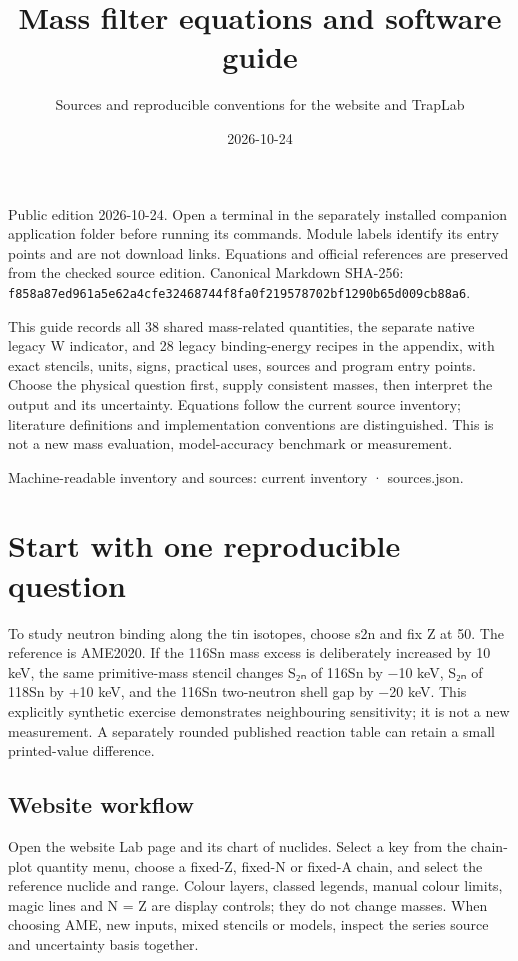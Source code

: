 \documentclass[
  11pt,
  letterpaper,
]{article}
\title{Mass filter equations and software guide}
\subtitle{Sources and reproducible conventions for the website and
TrapLab}
\author{}
\date{2026-10-24}
\begin{document}
\maketitle

Public edition 2026-10-24. Open a terminal in the separately installed
companion application folder before running its commands. Module labels
identify its entry points and are not download links. Equations and
official references are preserved from the checked source edition.
Canonical Markdown SHA-256:
\texttt{f858a87ed961a5e62a4cfe32468744f8fa0f219578702bf1290b65d009cb88a6}.

This guide records all 38 shared mass-related quantities, the separate
native legacy W indicator, and 28 legacy binding-energy recipes in the
appendix, with exact stencils, units, signs, practical uses, sources and
program entry points. Choose the physical question first, supply
consistent masses, then interpret the output and its uncertainty.
Equations follow the current source inventory; literature definitions
and implementation conventions are distinguished. This is not a new mass
evaluation, model-accuracy benchmark or measurement.

Machine-readable inventory and sources: current inventory ·
sources.json.

\section{Start with one reproducible
question}\label{start-with-one-reproducible-question}

To study neutron binding along the tin isotopes, choose s2n and fix Z at
50. The reference is AME2020. If the 116Sn mass excess is deliberately
increased by 10 keV, the same primitive-mass stencil changes S₂ₙ of
116Sn by −10 keV, S₂ₙ of 118Sn by +10 keV, and the 116Sn two-neutron
shell gap by −20 keV. This explicitly synthetic exercise demonstrates
neighbouring sensitivity; it is not a new measurement. A separately
rounded published reaction table can retain a small printed-value
difference.

\subsection{Website workflow}\label{website-workflow}

Open the website Lab page and its chart of nuclides. Select a key from
the chain-plot quantity menu, choose a fixed-Z, fixed-N or fixed-A
chain, and select the reference nuclide and range. Colour layers,
classed legends, manual colour limits, magic lines and N = Z are display
controls; they do not change masses. When choosing AME, new inputs,
mixed stencils or models, inspect the series source and uncertainty
basis together.
\end{document}

